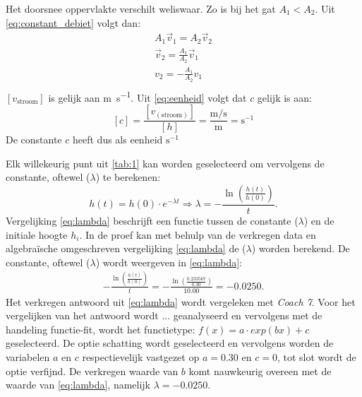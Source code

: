 \documentclass{scrartcl}
\begin{document}
Het doorsnee oppervlakte verschilt weliswaar. Zo is bij het gat $A_1 < A_2$. Uit \cref{eq:constant_debiet} volgt dan:
\begin{equation}\label{eq:v_h}
\begin{split}
    A_1\vec{v}_1 = A_2\vec{v}_2\\
    \vec{v}_2 = \frac{A_1}{A_2}\vec{v}_1\\
     v_2 = -\frac{A_1}{A_2}v_1\\
    \end{split}
    \end{equation}
$[v_{\text{stroom}}]$ is gelijk aan \si{\meter\per\second}. Uit \cref{eq:eenheid} volgt dat $c$ gelijk is aan:
\begin{equation}\label{eq:eenheid}
[c] = \frac{[v_{(\text{stroom})}]}{[h]} = \frac{\si{\meter\per\second}}{\si{\meter}} = \si{\second}^{-1}
\end{equation}
De constante $c$ heeft dus als eenheid $\si{\second}^{-1}$

Elk willekeurig punt uit \ref{tab:1} kan worden geselecteerd om vervolgens de constante, oftewel ($\lambda$) te berekenen:
\begin{equation}%
h(t) =h(0) \cdot e^{-\lambda t}
\Rightarrow \lambda = -\frac{\ln\left(\frac{h(t)}{h(0)}\right)}{t}.
\end{equation}
Vergelijking \cref{eq:lambda} beschrijft een functie tussen de constante ($\lambda$) en de initiale hoogte $h_i$. In de proef kan met behulp van de verkregen data en algebraïsche omgeschreven vergelijking \cref{eq:lambda} de ($\lambda$) worden berekend. De constante, oftewel ($\lambda$) wordt weergeven in \cref{eq:lambda}:
\begin{equation}
\begin{split}
-\frac{\ln\left(\frac{h(t)}{h(0)}\right)}{t}=-\frac{\ln\left(\frac{0.233567}{0.30}\right)}{10.00}=-0.0250.  
\end{split}
\end{equation}
Het verkregen antwoord uit \cref{eq:lambda} wordt vergeleken met \textit{Coach 7}. Voor het vergelijken van het antwoord wordt ... geanalyseerd en vervolgens met de handeling functie-fit, wordt het functietype: $f(x)=a \cdot exp(bx)+c$ geselecteerd. De optie schatting wordt geselecteerd en vervolgens worden de variabelen $a$ en $c$ respectievelijk vastgezet op $a=0.30$ en $c=0$, tot slot wordt de optie verfijnd. De verkregen waarde van $b$ komt nauwkeurig overeen met de waarde van \cref{eq:lambda}, namelijk $\lambda=-0.0250$.
\end{document}
